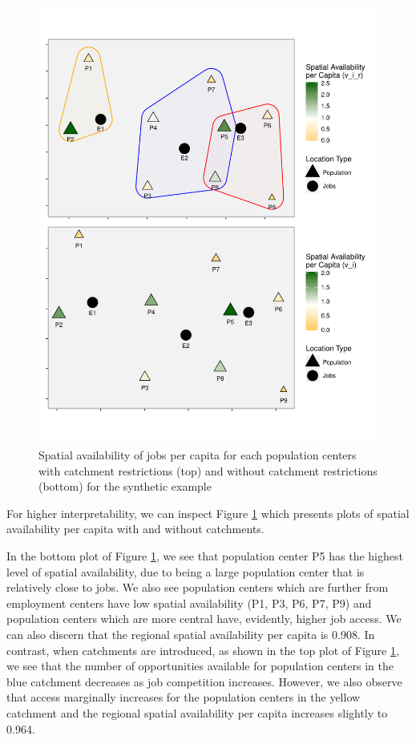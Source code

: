 \documentclass[]{elsarticle} %
\begin{document}
\begin{figure}
\includegraphics[width=1\linewidth]{Spatial-Availability_files/figure-latex/toy-example-availability-jobs-per-capita-1} \caption{\label{fig:toy-example-availability-jobs-per-capita} Spatial availability of jobs per capita for each population centers with catchment restrictions (top) and without catchment restrictions (bottom) for the synthetic example}\label{fig:toy-example-availability-jobs-per-capita}
\end{figure}

For higher interpretability, we can inspect Figure
\ref{fig:toy-example-availability-jobs-per-capita} which presents plots
of spatial availability per capita with and without catchments.

In the bottom plot of Figure
\ref{fig:toy-example-availability-jobs-per-capita}, we see that
population center P5 has the highest level of spatial availability, due
to being a large population center that is relatively close to jobs. We
also see population centers which are further from employment centers
have low spatial availability (P1, P3, P6, P7, P9) and population
centers which are more central have, evidently, higher job access. We
can also discern that the regional spatial availability per capita is
0.908. In contrast, when catchments are introduced, as shown in the top
plot of Figure \ref{fig:toy-example-availability-jobs-per-capita}, we
see that the number of opportunities available for population centers in
the blue catchment decreases as job competition increases. However, we
also observe that access marginally increases for the population centers
in the yellow catchment and the regional spatial availability per capita
increases slightly to 0.964.
\end{document}
